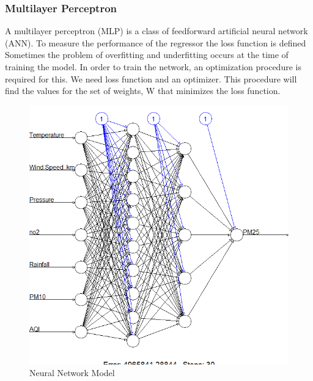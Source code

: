 \subsubsection{Multilayer Perceptron}
A multilayer perceptron (MLP) is a class of
feedforward artificial neural network (ANN). To
measure the performance of the regressor the loss
function is defined Sometimes the problem of
overfitting and underfitting occurs at the time of
training the model. In order to train the network,
an optimization procedure is required for this. We
need loss function and an optimizer. This
procedure will find the values for the set of
weights, W that minimizes the loss function.

\begin{figure}[h]
\label{ss}
\centering
\includegraphics[width= 11 cm]{deep_nue_mod.png}
\caption{Neural Network Model}
\end{figure} \pagebreak

